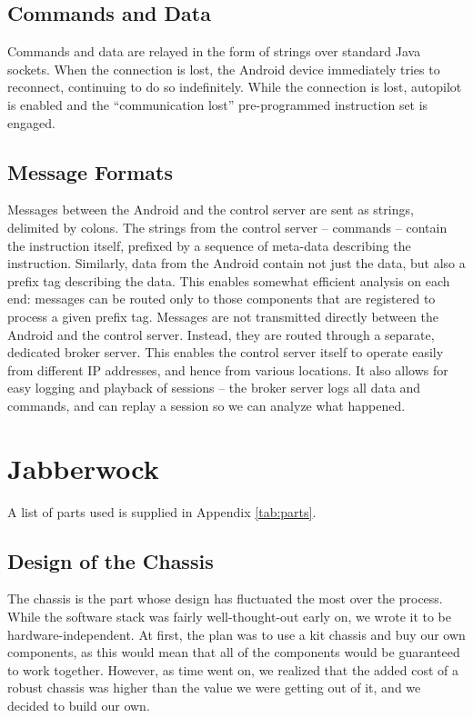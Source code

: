 \subsection{Commands and Data}
Commands and data are relayed in the form of strings over standard
Java sockets.‭ ‬When the connection is lost,‭ ‬the Android device
immediately tries to reconnect,‭ ‬continuing to do so indefinitely.‭
‬While the connection is lost, autopilot is enabled and the‭
``‬communication lost‭'' pre-programmed instruction set is engaged.

\subsection{Message Formats}
\label{sec:msgs}
‏Messages between the Android and the control server are sent as
strings,‭ ‬delimited by colons.‭ ‬The strings from the control server --
commands -- contain the instruction itself,‭ ‬prefixed by a sequence of
meta-data describing the instruction.‭ ‬Similarly,‭ ‬data from the Android
contain not just the data,‭ ‬but also a prefix tag describing the data.‭
‬This enables somewhat efficient analysis on each end:‭ ‬messages can be
routed only to those components that are registered to process a given
prefix tag.  Messages are not transmitted directly between the Android
and the control server.‭ ‬Instead,‭ ‬they are routed through a separate,‭
‬dedicated broker server.‭ ‬This enables the control server itself to
operate easily from different IP addresses,‭ ‬and hence from various
locations. It also allows for easy logging and playback of sessions --
the broker server logs all data and commands, and can replay a session
so we can analyze what happened.

\section{Jabberwock}
A list of parts used is supplied in Appendix \ref{tab:parts}.

\subsection{Design of the Chassis}
The chassis is the part whose design has fluctuated the most over the
process. While the software stack was fairly well-thought-out early
on, we wrote it to be hardware-independent. At first, the plan was to
use a kit chassis and buy our own components, as this would mean that
all of the components would be guaranteed to work together. However,
as time went on, we realized that the added cost of a robust chassis
was higher than the value we were getting out of it, and we decided to
build our own.

